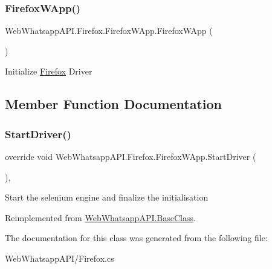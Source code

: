 \subsubsection{\texorpdfstring{Firefox\+W\+App()}{FirefoxWApp()}}
{\footnotesize\ttfamily Web\+Whatsapp\+A\+P\+I.\+Firefox.\+Firefox\+W\+App.\+Firefox\+W\+App (\begin{DoxyParamCaption}{ }\end{DoxyParamCaption})\hspace{0.3cm}{\ttfamily [inline]}}



Initialize \hyperlink{namespace_web_whatsapp_a_p_i_1_1_firefox}{Firefox} Driver 



\subsection{Member Function Documentation}
\mbox{\label{class_web_whatsapp_a_p_i_1_1_firefox_1_1_firefox_w_app_a80f406639e59bc4152b8f255962607f2}} 
\subsubsection{\texorpdfstring{Start\+Driver()}{StartDriver()}}
{\footnotesize\ttfamily override void Web\+Whatsapp\+A\+P\+I.\+Firefox.\+Firefox\+W\+App.\+Start\+Driver (\begin{DoxyParamCaption}{ }\end{DoxyParamCaption})\hspace{0.3cm}{\ttfamily [inline]}, {\ttfamily [virtual]}}



Start the selenium engine and finalize the initialisation 



Reimplemented from \hyperlink{class_web_whatsapp_a_p_i_1_1_base_class_a8108d46b4176fc74fb49626e8122df88}{Web\+Whatsapp\+A\+P\+I.\+Base\+Class}.



The documentation for this class was generated from the following file\+:\begin{DoxyCompactItemize}
\item 
Web\+Whatsapp\+A\+P\+I/Firefox.\+cs\end{DoxyCompactItemize}
